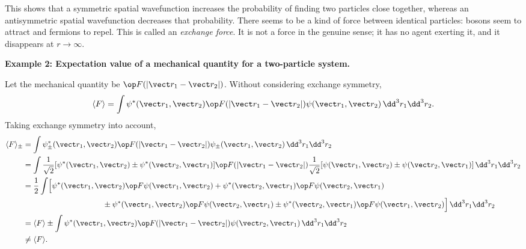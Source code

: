 \begin{center}
\end{center}

This shows that a symmetric spatial wavefunction increases the probability of finding two particles close together, whereas an antisymmetric spatial wavefunction decreases that probability. There seems to be a kind of force between identical particles: bosons seem to attract and fermions to repel. This is called an \emph{exchange force}. It is not a force in the genuine sense; it has no agent exerting it, and it disappears at $r\to\infty$.

\textbf{Example 2: Expectation value of a mechanical quantity for a two-particle system.}

Let the mechanical quantity be $\op F(|\vect r_1-\vect r_2|)$. Without considering exchange symmetry,
\[\langle F\rangle=\int\psi^*(\vect r_1,\vect r_2)
\op F(|\vect r_1-\vect r_2|)\psi(\vect r_1,\vect r_2)
\,\dd^3r_1\dd^3r_2.\]
Taking exchange symmetry into account,
\begin{align*}
\langle F\rangle_\pm
&=\int\psi_\pm^*(\vect r_1,\vect r_2)
\op F(|\vect r_1-\vect r_2|)\psi_\pm(\vect r_1,\vect r_2)
\,\dd^3r_1\dd^3r_2\\
&=\int\frac1{\sqrt2}[\psi^*(\vect r_1,\vect r_2)\pm\psi^*(\vect r_2,\vect r_1)]
\op F(|\vect r_1-\vect r_2|)
\frac1{\sqrt2}[\psi(\vect r_1,\vect r_2)\pm\psi(\vect r_2,\vect r_1)]
\,\dd^3r_1\dd^3r_2\\
&=\frac12\int\Bigl[
\psi^*(\vect r_1,\vect r_2)\op F\psi(\vect r_1,\vect r_2)
+\psi^*(\vect r_2,\vect r_1)\op F\psi(\vect r_2,\vect r_1)\\
&\hspace{36mm}\pm\psi^*(\vect r_1,\vect r_2)\op F\psi(\vect r_2,\vect r_1)
\pm\psi^*(\vect r_2,\vect r_1)\op F\psi(\vect r_1,\vect r_2)
\Bigr]\,\dd^3r_1\dd^3r_2\\
&=\langle F\rangle\pm
\int\psi^*(\vect r_1,\vect r_2)
\op F(|\vect r_1-\vect r_2|)
\psi(\vect r_2,\vect r_1)\,\dd^3r_1\dd^3r_2\\
&\ne\langle F\rangle.
\end{align*}

